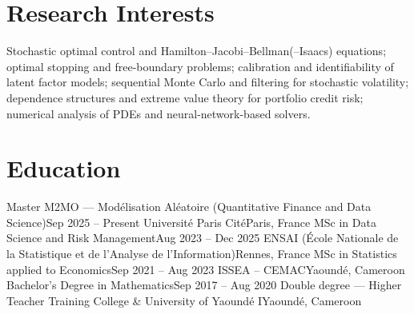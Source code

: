 




\section{Research Interests}
\begin{itemize}[leftmargin=0.15in, label={}]
  \small{\item{
    Stochastic optimal control and Hamilton--Jacobi--Bellman(--Isaacs) equations; optimal stopping and free-boundary problems;
    calibration and identifiability of latent factor models; sequential Monte Carlo and filtering for stochastic volatility;
    dependence structures and extreme value theory for portfolio credit risk; numerical analysis of PDEs and
    neural-network-based solvers.
  }}
\end{itemize}

\section{Education}
\resumeSubHeadingListStart
  \resumeSubheading
    {Master M2MO --- Mod\'elisation Al\'eatoire (Quantitative Finance and Data Science)}{Sep 2025 -- Present}
    {Universit\'e Paris Cit\'e}{Paris, France}
  \vspace{3pt}
  \resumeSubheading
    {MSc in Data Science and Risk Management}{Aug 2023 -- Dec 2025}
    {ENSAI (\'Ecole Nationale de la Statistique et de l'Analyse de l'Information)}{Rennes, France}
  \vspace{3pt}
  \resumeSubheading
    {MSc in Statistics applied to Economics}{Sep 2021 -- Aug 2023}
    {ISSEA -- CEMAC}{Yaound\'e, Cameroon}
  \vspace{3pt}
  \resumeSubheading
    {Bachelor's Degree in Mathematics}{Sep 2017 -- Aug 2020}
    {Double degree --- Higher Teacher Training College \& University of Yaound\'e I}{Yaound\'e, Cameroon}
\resumeSubHeadingListEnd

